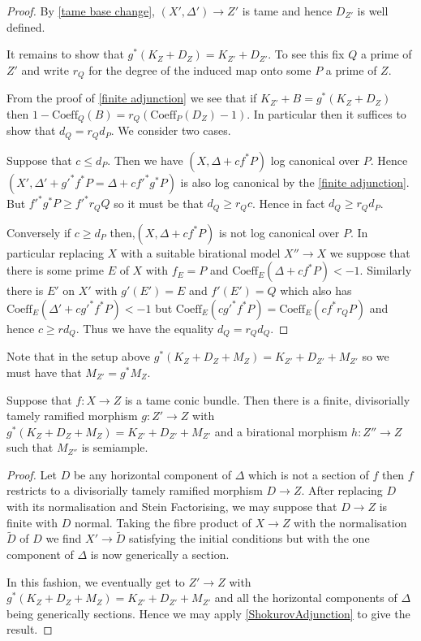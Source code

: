 \documentclass[a4paper,12pt]{book}
\begin{document}
\begin{proof}
	By \autoref{tame base change}, $(X',\Delta') \to Z'$ is tame and hence $D_{Z'}$ is well defined.
	
	It remains to show that $g^{*}(K_{Z}+D_{Z})=K_{Z'}+D_{Z'}$. To see this fix $Q$ a prime of $Z'$ and write $r_{Q}$ for the degree of the induced map onto some $P$ a prime of $Z$. 
	
	From the proof of \autoref{finite adjunction} we see that if $K_{Z'}+B=g^{*}(K_{Z}+D_{Z})$ then $1-\text{Coeff}_{Q}(B)=r_{Q}(\text{Coeff}_{P}(D_{Z})-1)$. In particular then it suffices to show that $d_{Q}=r_{Q}d_{P}$. We consider two cases.
	
	Suppose that $c \leq d_{P}$. Then we have $(X,\Delta+cf^{*}P)$ log canonical over $P$. Hence $(X',\Delta'+g'^{*}f^{*}P=\Delta+cf'^{*}g^{*}P)$ is also log canonical by the \autoref{finite adjunction}. But $f'^{*}g^{*}P \geq f'^{*}r_{Q}Q$ so it must be that $d_{Q} \geq r_{Q}c$. Hence in fact $d_{Q} \geq r_{Q}d_{P}$.
	
	Conversely if $c \geq d_{P}$ then,$(X,\Delta+cf^{*}P)$ is not log canonical over $P$. In particular replacing $X$ with a suitable birational model $X'' \to X$ we suppose that there is some prime $E$ of $X$ with $f_{E}=P$ and $\text{Coeff}_{E}(\Delta+cf^{*}P) < -1$. Similarly there is $E'$ on $X'$ with $g'(E')=E$ and $f'(E')=Q$ which also has $\text{Coeff}_{E}(\Delta'+cg'^{*}f^{*}P) < -1$ but $\text{Coeff}_{E}(cg'^{*}f^{*}P)=\text{Coeff}_{E}(cf^{*}r_{Q}P)$ and hence $c \geq rd_{Q}$. Thus we have the equality $d_{Q}=r_{Q}d_{Q}$.
\end{proof}


Note that in the setup above $g^{*}(K_{Z}+D_{Z}+M_{Z})=K_{Z'}+D_{Z'}+M_{Z'}$ so we must have that $M_{Z'}=g^{*}M_{Z}$.

\begin{lemma}
	Suppose that $f\colon X \to Z$ is a tame conic bundle. Then there is a finite, divisorially tamely ramified morphism $g\colon Z' \to Z$ with $g^{*}(K_{Z}+D_{Z}+M_{Z})=K_{Z'}+D_{Z'}+M_{Z'}$ and a birational morphism $h\colon Z'' \to Z$ such that $M_{Z''}$ is semiample.
\end{lemma}
\begin{proof}
	Let $D$ be any horizontal component of $\Delta$ which is not a section of $f$ then $f$ restricts to a divisorially tamely ramified morphism $D \to Z$. After replacing $D$ with its normalisation and Stein Factorising, we may suppose that $D\to Z$ is finite with $D$ normal. Taking the fibre product of $X \to Z$ with the normalisation $\tilde{D}$ of $D$ we find $X' \to \tilde{D}$ satisfying the initial conditions but with the one component of $\Delta$ is now  generically a section.
	
	In this fashion, we eventually get to $Z' \to Z$ with $g^{*}(K_{Z}+D_{Z}+M_{Z})=K_{Z'}+D_{Z'}+M_{Z'}$ and all the horizontal components of $\Delta$ being generically sections. Hence we may apply \autoref{ShokurovAdjunction} to give the result.
\end{proof}
\end{document}
